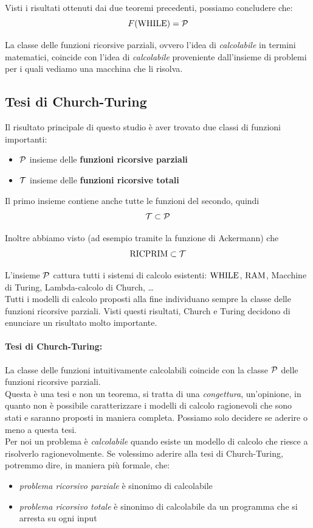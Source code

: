 Visti i risultati ottenuti dai due teoremi precedenti, possiamo concludere che: 
$$ F(\text{WHILE}) = \mathcal{P} $$

La classe delle funzioni ricorsive parziali, ovvero l'idea di \textit{calcolabile} in termini matematici, coincide con l'idea di \textit{calcolabile} proveniente dall'insieme di problemi per i quali vediamo una macchina che li risolva.\\

\subsection{Tesi di Church-Turing}
Il risultato principale di questo studio è aver trovato due classi di funzioni importanti: 
\begin{itemize}
	\item $\mathcal{P}$ insieme delle \textbf{funzioni ricorsive parziali}
	\item $\mathcal{T}$ insieme delle \textbf{funzioni ricorsive totali}
\end{itemize}

Il primo insieme contiene anche tutte le funzioni del secondo, quindi
$$ \mathcal{T} \subset \mathcal{P} $$

Inoltre abbiamo visto (ad esempio tramite la funzione di Ackermann) che
$$ \text{RICPRIM} \subset \mathcal{T} $$

L'insieme $\mathcal{P}$ cattura tutti i sistemi di calcolo esistenti: $\text{WHILE}$, $\text{RAM}$, Macchine di Turing, Lambda-calcolo di Church, \dots\\
Tutti i modelli di calcolo proposti alla fine individuano sempre la classe delle funzioni ricorsive parziali. Visti questi risultati, Church e Turing decidono di enunciare un risultato molto importante.\\

\paragraph{Tesi di Church-Turing:} La classe delle funzioni intuitivamente calcolabili coincide con la classe $\mathcal{P}$ delle funzioni ricorsive parziali.\\

Questa è una tesi e non un teorema, si tratta di una \textit{congettura}, un'opinione, in quanto non è possibile caratterizzare i modelli di calcolo ragionevoli che sono stati e saranno proposti in maniera completa. Possiamo solo decidere se aderire o meno a questa tesi.\\

Per noi un problema è \textit{calcolabile} quando esiste un modello di calcolo che riesce a risolverlo ragionevolmente. Se volessimo aderire alla tesi di Church-Turing, potremmo dire, in maniera più formale, che:
\begin{itemize}
	\item \textit{problema ricorsivo parziale} è sinonimo di calcolabile
	\item \textit{problema ricorsivo totale} è sinonimo di calcolabile da un programma che si arresta su ogni input
\end{itemize}

